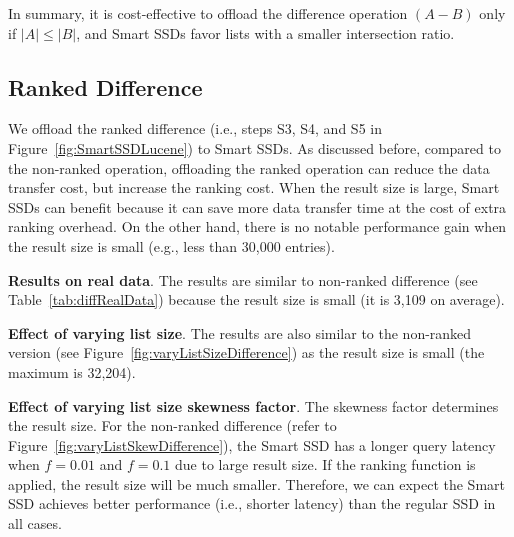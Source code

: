 In summary, it is cost-effective to offload the \textsf{difference} operation $(A-B)$ only if $|A| \le |B|$, and Smart SSDs favor lists with a smaller intersection ratio.

\subsection{Ranked Difference}\label{sec:expRankedDifference}
We offload the \textsf{ranked difference} (i.e., steps S3, S4, and S5 in Figure~\ref{fig:SmartSSDLucene}) to Smart SSDs.
As discussed before, compared to the non-ranked operation, offloading the ranked operation can reduce the data transfer cost, but increase the ranking cost. When the result size is large, Smart SSDs can benefit because it can save more data transfer time at the cost of extra ranking overhead. On the other hand, there is no notable performance gain when the result size is small (e.g., less than 30,000 entries).

\textbf{Results on real data}.
The results are similar to non-ranked difference (see Table~\ref{tab:diffRealData}) because the result size is small (it is 3,109 on average).



\textbf{Effect of varying list size}.
The results are also similar to the non-ranked version (see Figure~\ref{fig:varyListSizeDifference}) as the result size is small (the maximum is 32,204).

\textbf{Effect of varying list size skewness factor}.
The skewness factor determines the result size. For the non-ranked difference (refer to Figure~\ref{fig:varyListSkewDifference}),
the Smart SSD has a longer query latency when $f=0.01$ and $f=0.1$ due to large result size. If the ranking function is applied, the result size will be much smaller. Therefore, we can expect the Smart SSD achieves better performance (i.e., shorter latency) than the regular SSD in all cases.

